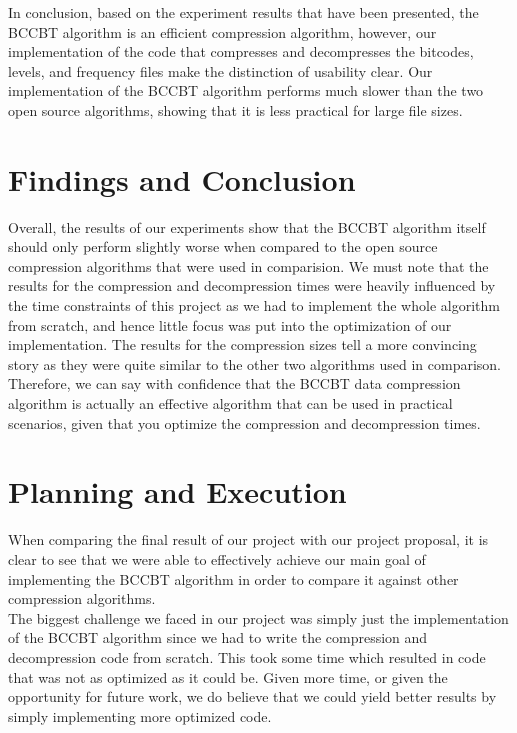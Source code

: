 \documentclass[12pt]{IEEEtran}
\begin{document}
In conclusion,
based on the experiment results that have been presented, the BCCBT algorithm is an efficient 
compression algorithm, however, our implementation of the code that compresses and decompresses the bitcodes,
levels, and frequency files make the distinction of usability clear. Our implementation of the 
BCCBT algorithm performs much slower than the two open source algorithms, showing that it is less practical for large file sizes.

\section{Findings and Conclusion}
Overall, the results of our experiments show that the BCCBT algorithm itself should only perform slightly worse
when compared to the open source compression algorithms that were used in comparision.
We must note that the results for the compression and decompression times were heavily influenced by the time constraints of this project
as we had to implement the whole algorithm from scratch, and hence little focus was put into the optimization of our implementation.
The results for the compression sizes tell a more convincing story as they were quite similar to 
the other two algorithms used in comparison. Therefore, we can say with confidence that the BCCBT data compression algorithm
is actually an effective algorithm that can be used in practical scenarios, given that you optimize the compression and decompression times.

\section{Planning and Execution}

When comparing the final result of our project with our project proposal, it is clear to see that we were able to effectively
achieve our main goal of implementing the BCCBT algorithm in order to compare it against other
compression algorithms. \\

The biggest challenge we faced in our
project was simply just the implementation of the BCCBT algorithm since we had to write the compression and 
decompression code from scratch.
This took some time which resulted in code that was not as optimized as it could be. 
Given more time, or given the opportunity for future work, we do believe that we could yield better results by simply implementing more optimized code. \\
\end{document}
